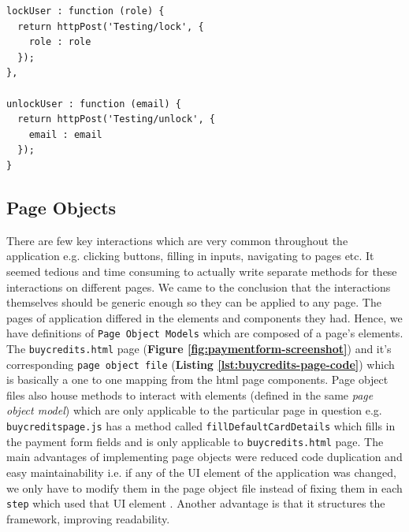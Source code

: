 \begin{listing}[H]
\begin{verbatim}
lockUser : function (role) {
  return httpPost('Testing/lock', {
    role : role
  });
},

unlockUser : function (email) {
  return httpPost('Testing/unlock', {
    email : email
  });
}
\end{verbatim}
\label{lst:login-and-logout-hooks}
\end{listing}

\subsection{Page Objects}
\label{subsec:page-objects}
There are few key interactions which are very common throughout the application e.g. clicking buttons, filling in inputs, navigating to pages etc. It seemed tedious and time consuming to actually write separate methods for these interactions on different pages. We came to the conclusion that the interactions themselves should be generic enough so they can be applied to any page. The pages of application differed in the elements and components they had. Hence, we have definitions of \texttt{Page Object Models} which are composed of a page's elements.\\

The \texttt{buycredits.html} page (\textbf{Figure \ref{fig:paymentform-screenshot}}) and it's corresponding \texttt{page object file} (\textbf{Listing \ref{lst:buycredits-page-code}}) which is basically a one to one mapping from the html page components. Page object files also house methods to interact with elements (defined in the same \textit{page object model}) which are only applicable to the particular page in question e.g. \texttt{buycreditspage.js} has a method called \texttt{fillDefaultCardDetails} which fills in the payment form fields and is only applicable to \texttt{buycredits.html} page. The main advantages of implementing page objects were reduced code duplication and easy maintainability i.e.  if any of the UI element of the application was changed, we only have to modify them in the page object file instead of fixing them in each \texttt{step} which used that UI element \cite{semaphore}. Another advantage is that it structures the framework, improving readability.

